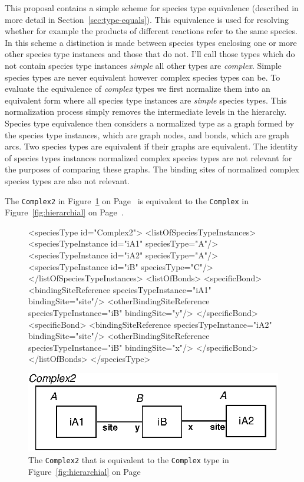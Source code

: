 \documentclass{cekarticle}
\begin{document}
This proposal contains a simple scheme for species type
equivalence (described in more detail in
Section~\ref{sec:type-equals}). This equivalence is used for
resolving whether for example the products of different reactions
refer to the same species. In this scheme a distinction is made
between species types enclosing one or more other species type
instances and those that do not.  I'll call those types which do
not contain species type instances \emph{simple} all other types
are \emph{complex}. Simple species types are never equivalent
however complex species types can be.  To evaluate the equivalence
of \emph{complex} types we first normalize them into an equivalent
form where all species type instances are \emph{simple} species
types.  This normalization process simply removes the intermediate
levels in the hierarchy.  Species type equivalence then considers
a normalized type as a graph formed by the species type instances,
which are graph nodes, and bonds, which are graph arcs. Two
species types are equivalent if their graphs are equivalent. The
identity of species types instances normalized complex species
types are not relevant for the purposes of comparing these graphs.
The binding sites of normalized complex species types are also not
relevant.

The \texttt{Complex2}  in Figure~\ref{fig:complex2} on Page~\pageref{fig:complex2} is
equivalent to the \texttt{Complex}  in Figure~\ref{fig:hierarchial} on
Page~\pageref{fig:hierarchial}.

\begin{figure}

\begin{example}
<speciesType id="Complex2">
    <listOfSpeciesTypeInstances>
        <speciesTypeInstance id="iA1" speciesType="A"/>
        <speciesTypeInstance id="iA2" speciesType="A"/>
        <speciesTypeInstance id="iB" speciesType="C"/>
    </listOfSpeciesTypeInstances>
    <listOfBonds>
        <specificBond>
            <bindingSiteReference speciesTypeInstance="iA1" bindingSite="site"/>
            <otherBindingSiteReference speciesTypeInstance="iB" bindingSite="y"/>
        </specificBond>
        <specificBond>
            <bindingSiteReference speciesTypeInstance="iA2" bindingSite="site"/>
            <otherBindingSiteReference speciesTypeInstance="iB" bindingSite="x"/>
        </specificBond>
    </listOfBonds>
</speciesType>
\end{example}
  \vspace*{8pt}
  \centering
  \includegraphics[scale = 0.7]{complex2.eps}
\caption{The \texttt{Complex2}  that is equivalent to the \texttt{Complex} type in
Figure~\ref{fig:hierarchial} on Page~\pageref{fig:hierarchial}}
\label{fig:complex2}
\end{figure}
\end{document}
